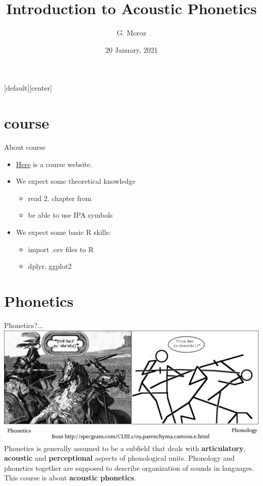 
[default][center]
\title[]{Introduction to Acoustic Phonetics}
\author[]{G. Moroz}
\date{20 January, 2021}

\frame{\titlepage}
\section{course}
\begin{frame}{About course}
\begin{itemize}
\item \href{https://agricolamz.github.io/2021_HSE_m_Instrumental_phonetics/}{Here} is a course website.
\item We expect some theoretical knowledge
\begin{itemize}
\item read 2. chapter from \citep{gussenhoven11}
\item be able to use IPA symbols
\end{itemize}
\item We expect some basic R skills:
\begin{itemize}
\item import .csv files to R
\item dplyr, ggplot2
\end{itemize}
\end{itemize}
\end{frame}
\section{Phonetics}
\begin{frame}{Phonetics?...}
\includegraphics[width=\linewidth]{03-Phonetics-vs-Phonology.png}\\
Phonetics is generally assumed to be a subfield that deals with \textbf{articulatory}, \textbf{acoustic} and \textbf{perceptional} aspects of phonological units. Phonology and phonetics together are supposed to describe organization of sounds in languages. \bigskip\\
This course is about \textbf{acoustic  phonetics}.

\end{frame}
